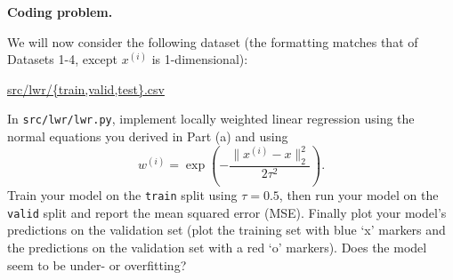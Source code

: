 \item {} \textbf{Coding problem.}

We will now consider the following dataset (the
formatting matches that of Datasets 1-4, except $x^{(i)}$ is 1-dimensional):
\begin{center}
	\url{src/lwr/{train,valid,test}.csv}	
\end{center}

In \texttt{src/lwr/lwr.py}, implement locally weighted linear regression
using the normal equations you derived in Part (a) and using
%
\begin{equation*}
	w^{(i)} = \exp\left(-\frac{\|x^{(i)} - x\|_2^2}{2\tau^2}\right).
\end{equation*}
%
Train your model on the \texttt{train} split using $\tau = 0.5$, then run your
model on the \texttt{valid} split and report the mean squared error (MSE).
Finally plot your model's predictions on the validation set (plot the
training set with blue `x' markers and the predictions on the
validation set with a red `o' markers). Does the model seem to be under-
or overfitting?

